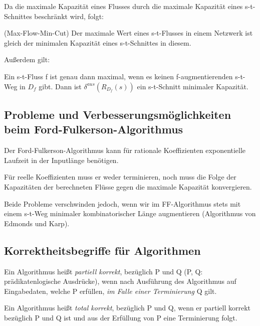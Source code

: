 \documentclass[10pt]{scrbook}
\begin{document}
Da die maximale Kapazität eines Flusses durch die maximale Kapazität eines s-t-Schnittes beschränkt wird, folgt:

\begin{Sa} (Max-Flow-Min-Cut)
Der maximale Wert eines s-t-Flusses in einem Netzwerk ist gleich der minimalen Kapazität eines s-t-Schnittes in diesem.
\end{Sa}

Außerdem gilt:

\begin{Sa}
\label{sa:ff-korrekt}
Ein s-t-Fluss f ist genau dann maximal, wenn es keinen f-augmentierenden s-t-Weg in $D_f$ gibt. Dann ist $\delta^{aus}\left(R_{D_f}(s)\right)$ ein s-t-Schnitt minimaler Kapazität.
\end{Sa}

\subsection{Probleme und Verbesserungsmöglichkeiten beim Ford-Fulkerson-Algorithmus}

Der Ford-Fulkerson-Algorithmus kann für rationale Koeffizienten exponentielle Laufzeit in der Inputlänge benötigen.

Für reelle Koeffizienten muss er weder terminieren, noch muss die Folge der Kapazitäten der berechneten Flüsse gegen die maximale Kapazität konvergieren.

Beide Probleme verschwinden jedoch, wenn wir im FF-Algorithmus stets mit einem s-t-Weg minimaler kombinatorischer Länge augmentieren (Algorithmus von Edmonds und Karp).

\subsection{Korrektheitsbegriffe für Algorithmen}

\begin{Def}
Ein Algorithmus heißt \emph{partiell korrekt}, bezüglich P und Q (P, Q: prädikatenlogische Ausdrücke), wenn 
nach Ausführung des Algorithmus auf Eingabedaten, welche P erfüllen, \emph{im Falle einer Terminierung} Q gilt.
\end{Def}

\begin{Def}
Ein Algorithmus heißt \emph{total korrekt}, bezüglich P und Q, wenn er partiell korrekt bezüglich P und Q ist und aus der Erfüllung von P eine Terminierung folgt.
\end{Def}
\end{document}
